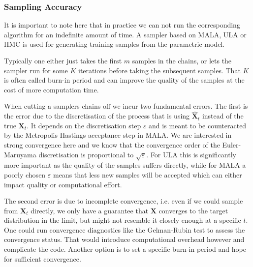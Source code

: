 \subsubsection{Sampling Accuracy}

It is important to note here that in practice we can not run the corresponding algorithm for an indefinite amount of time.
A sampler based on MALA, ULA or HMC is used for generating training samples from the parametric model.

Typically one either just takes the first $m$ samples in the chains, or lets the sampler run for some $K$ iterations before taking the subsequent samples.
That $K$ is often called burn-in period and can improve the quality of the samples at the cost of more computation time.

When cutting a samplers chains off we incur two fundamental errors. 
The first is the error due to the discretisation of the process that is using $\hat{\bm{X}}_t$ instead of the true $\bm{X}_t$.
It depends on the discretisation step $\varepsilon$ and is meant to be counteracted by the Metropolis Hastings acceptance step in MALA.
We are interested in strong convergence here and we know that the convergence order of the Euler-Maruyama discretisation is proportional to $\sqrt{\varepsilon}$.
For ULA this is significantly more important as the quality of the samples suffers directly, 
while for MALA a poorly chosen $\varepsilon$ means that less new samples will be accepted which can either impact quality or computational effort.

The second error is due to incomplete convergence, i.e. even if we could sample from $\bm{X}_t$ directly,
we only have a guarantee that $\bm{X}$ converges to the target distribution in the limit, 
but might not resemble it closely enough at a specific $t$.
One could run convergence diagnostics like the Gelman-Rubin test to assess the convergence status.
That would introduce computational overhead however and complicate the code.
Another option is to set a specific burn-in period and hope for sufficient convergence.







